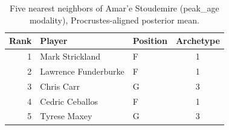 \begin{table}[htbp]
  \centering\small
  \begin{tabular}{rllc}
    \toprule
    Rank & Player & Position & Archetype \\
    \midrule
    1 & Mark Strickland & F & 1 \\
    2 & Lawrence Funderburke & F & 1 \\
    3 & Chris Carr & G & 3 \\
    4 & Cedric Ceballos & F & 1 \\
    5 & Tyrese Maxey & G & 3 \\
    \bottomrule
  \end{tabular}
  \caption{Five nearest neighbors of Amar'e Stoudemire (peak_age modality), Procrustes-aligned posterior mean.}
  \label{tab:Amar_e_Stoudemire_neighbors_peak_age}
\end{table}

